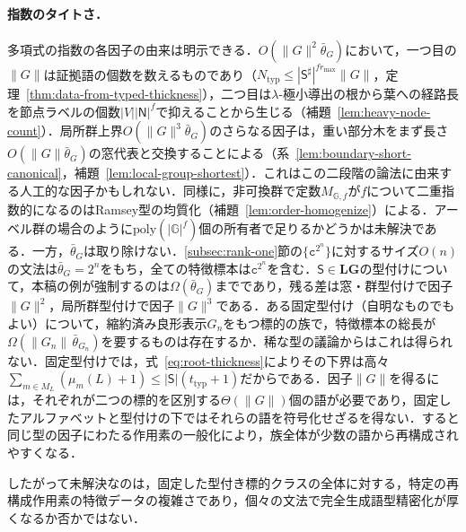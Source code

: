 \paragraph{指数のタイトさ．}
多項式の指数の各因子の由来は明示できる．$O(\|G\|^2\bar\theta_G)$において，一つ目の$\|G\|$は証拠語の個数を数えるものであり（$N_{\mathrm{typ}}\le|\mathsf S^\sharp|^{fr_{\max}}\|G\|$，定理~\ref{thm:data-from-typed-thickness}），二つ目は$\lambda$-極小導出の根から葉への経路長を節点ラベルの個数$|V||\mathsf N|^f$で抑えることから生じる（補題~\ref{lem:heavy-node-count}）．局所群上界$O(\|G\|^3\bar\theta_G)$のさらなる因子は，重い部分木をまず長さ$O(\|G\|\bar\theta_G)$の窓代表と交換することによる（系~\ref{lem:boundary-short-canonical}，補題~\ref{lem:local-group-shortest}）．これはこの二段階の論法に由来する人工的な因子かもしれない．同様に，非可換群で定数$M_{\mathbb G,f}$が$f$について二重指数的になるのはRamsey型の均質化（補題~\ref{lem:order-homogenize}）による．アーベル群の場合のように$\mathrm{poly}(|\mathbb G|^f)$個の所有者で足りるかどうかは未解決である．一方，$\bar\theta_G$は取り除けない．\ref{subsec:rank-one}節の$\{\mathtt c^{2^n}\}$に対するサイズ$O(n)$の文法は$\bar\theta_G=2^n$をもち，全ての特徴標本は$\mathtt c^{2^n}$を含む．$\mathsf S\in\mathbf{LG}$の型付けについて，本稿の例が強制するのは$\Omega(\bar\theta_G)$までであり，残る差は窓・群型付けで因子$\|G\|^2$，局所群型付けで因子$\|G\|^3$である．ある固定型付け（自明なものでもよい）について，縮約済み良形表示$G_n$をもつ標的の族で，特徴標本の総長が$\Omega(\|G_n\|\,\bar\theta_{G_n})$を要するものは存在するか．稀な型の議論からはこれは得られない．固定型付けでは，式~\eqref{eq:root-thickness}によりその下界は高々$\sum_{m\in M_L}(\mu_m(L)+1)\le|\mathsf S|(t_{\mathrm{typ}}+1)$だからである．因子$\|G\|$を得るには，それぞれが二つの標的を区別する$\Theta(\|G\|)$個の語が必要であり，固定したアルファベットと型付けの下ではそれらの語を符号化せざるを得ない．すると同じ型の因子にわたる作用素の一般化により，族全体が少数の語から再構成されやすくなる．

したがって未解決なのは，固定した型付き標的クラスの全体に対する，特定の再構成作用素の特徴データの複雑さであり，個々の文法で完全生成語型精密化が厚くなるか否かではない．


